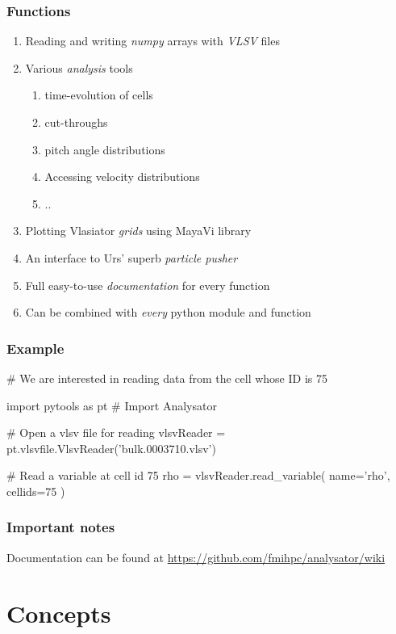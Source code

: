 \documentclass{beamer}
\begin{document}
\begin{frame}
 \frametitle{Functions}
 \begin{enumerate}
  \item Reading and writing \emph{numpy} arrays with \emph{VLSV} files
  \item Various \emph{analysis} tools
  \begin{enumerate}
   \item time-evolution of cells
   \item cut-throughs
   \item pitch angle distributions
   \item Accessing velocity distributions
   \item ..
  \end{enumerate}
  \item Plotting Vlasiator \emph{grids} using MayaVi library
  \item An interface to Urs' superb \emph{particle pusher}
  \item Full easy-to-use \emph{documentation} for every function
  \item Can be combined with \emph{every} python module and function
 \end{enumerate}
\end{frame}

\begin{frame}[fragile]
 \frametitle{Example}
 \begin{python}[basicstyle=\tiny]
  # We are interested in reading data from the cell whose ID is 75
 
  import pytools as pt # Import Analysator
  
  # Open a vlsv file for reading
  vlsvReader = pt.vlsvfile.VlsvReader('bulk.0003710.vlsv')
  
  # Read a variable at cell id 75
  rho = vlsvReader.read_variable( name='rho', cellids=75 )
 \end{python}
\end{frame}

\begin{frame}
 \frametitle{Important notes}
 Documentation can be found at \url{https://github.com/fmihpc/analysator/wiki}
\end{frame}


\section{Concepts}
\end{document}
